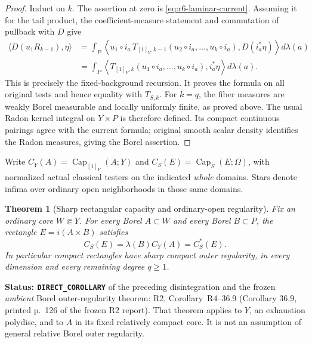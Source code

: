 \documentclass[11pt,a4paper]{article}
\numberwithin{equation}{section}
\newtheorem{theorem}{Theorem}[section]
\theoremstyle{definition}
\theoremstyle{remark}
\begin{document}
\begin{proof}
Induct on $k$. The assertion at zero is
\eqref{eq:r6-laminar-current}. Assuming it for the tail product, the
coefficient-measure statement and commutation of pullback with $D$ give
\[
 \begin{split}
 \langle D(u_1R_{k-1}),\eta\rangle
  &=\int_P\left\langle
       u_1\circ i_a\,
       T_{[1]_Y,k-1}(u_2\circ i_a,\ldots,u_k\circ i_a),
                              D(i_a^*\eta)\right\rangle d\lambda(a)\\
  &=\int_P\left\langle
       T_{[1]_Y,k}(u_1\circ i_a,\ldots,u_k\circ i_a),
                                      i_a^*\eta\right\rangle d\lambda(a).
 \end{split}
\]
This is precisely the fixed-background recursion. It proves the formula
on all original tests and hence equality with $T_{S,k}$.
For $k=q$, the fiber measures are weakly Borel measurable and locally
uniformly finite, as proved above. The usual Radon kernel integral on
$Y\times P$ is therefore defined. Its compact continuous pairings agree
with the current formula; original smooth scalar density identifies
the Radon measures, giving the Borel assertion.
\end{proof}

Write $C_Y(A)=\operatorname{Cap}_{[1]_Y}(A;Y)$ and
$C_S(E)=\operatorname{Cap}_S(E;\Omega)$, with normalized actual classical
testers on the indicated \emph{whole} domains. Stars denote infima over
ordinary open neighborhoods in those same domains.

\begin{theorem}[Sharp rectangular capacity and ordinary-open regularity]
\label{thm:r6-laminar-rectangle-capacity}
Fix an ordinary core $W\Subset Y$. For every Borel $A\subset W$ and
every Borel $B\subset P$, the rectangle $E=i(A\times B)$ satisfies
\begin{equation}
                  C_S(E)=\lambda(B)C_Y(A)=C_S^*(E).
\label{eq:r6-laminar-rectangle-capacity}
\end{equation}
In particular compact rectangles have sharp compact outer regularity,
in every dimension and every remaining degree $q\geq1$.
\end{theorem}

\noindent\textbf{Status: \texttt{DIRECT\_COROLLARY}} of the preceding
disintegration and the frozen \emph{ambient} Borel outer-regularity
theorem: R2, Corollary~\textup{R4--36.9} (Corollary 36.9,
printed p.~126 of the frozen R2 report). That theorem applies to $Y$,
an exhaustion polydisc, and to $A$ in its fixed relatively compact core.
It is not an assumption of general relative Borel outer regularity.
\end{document}
